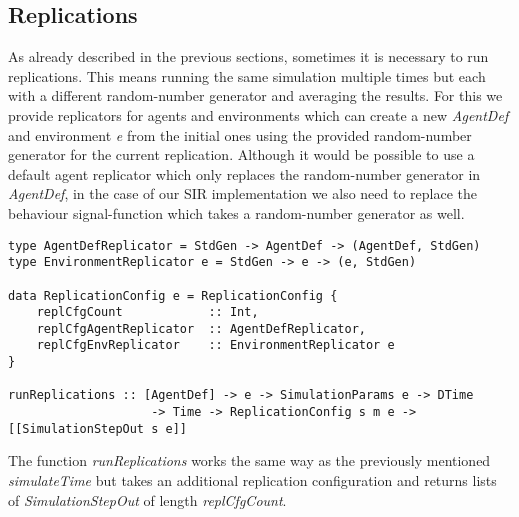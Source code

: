 \subsection{Replications}
As already described in the previous sections, sometimes it is necessary to run replications. This means running the same simulation multiple times but each with a different random-number generator and averaging the results. For this we provide replicators for agents and environments which can create a new \textit{AgentDef} and environment \textit{e} from the initial ones using the provided random-number generator for the current replication. Although it would be possible to use a default agent replicator which only replaces the random-number generator in \textit{AgentDef}, in the case of our SIR implementation we also need to replace the behaviour signal-function which takes a random-number generator as well.

\begin{verbatim}
type AgentDefReplicator = StdGen -> AgentDef -> (AgentDef, StdGen)
type EnvironmentReplicator e = StdGen -> e -> (e, StdGen)

data ReplicationConfig e = ReplicationConfig {
    replCfgCount            :: Int,
    replCfgAgentReplicator  :: AgentDefReplicator,
    replCfgEnvReplicator    :: EnvironmentReplicator e
}

runReplications :: [AgentDef] -> e -> SimulationParams e -> DTime
                    -> Time -> ReplicationConfig s m e -> [[SimulationStepOut s e]]
\end{verbatim}

The function \textit{runReplications} works the same way as the previously mentioned \textit{simulateTime} but takes an additional replication configuration and returns lists of \textit{SimulationStepOut} of length \textit{replCfgCount}.